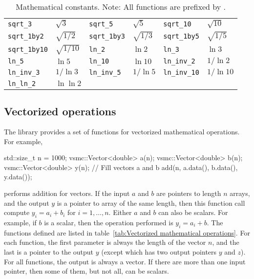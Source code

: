 \begin{table}[ht]
\begin{tabu}{X[2l]X[l]X[2l]X[l]X[2l]X[l]}
    \texttt{sqrt\_3}        & $\sqrt{3}$         &
    \texttt{sqrt\_5}        & $\sqrt{5}$         &
    \texttt{sqrt\_10}       & $\sqrt{10}$        \\
    \texttt{sqrt\_1by2}     & $\sqrt{1/2}$       &
    \texttt{sqrt\_1by3}     & $\sqrt{1/3}$       &
    \texttt{sqrt\_1by5}     & $\sqrt{1/5}$       \\
    \texttt{sqrt\_1by10}    & $\sqrt{1/10}$      &
    \texttt{ln\_2}          & $\ln{2}$           &
    \texttt{ln\_3}          & $\ln{3}$           \\
    \texttt{ln\_5}          & $\ln{5}$           &
    \texttt{ln\_10}         & $\ln{10}$          &
    \texttt{ln\_inv\_2}     & $1/\ln{2}$         \\
    \texttt{ln\_inv\_3}     & $1/\ln{3}$         &
    \texttt{ln\_inv\_5}     & $1/\ln{5}$         &
    \texttt{ln\_inv\_10}    & $1/\ln{10}$        \\
    \texttt{ln\_ln\_2}      & $\ln\ln{2}$        &
    &                    &
    &                    \\
    \bottomrule
  \end{tabu}
  \caption{Mathematical constants. Note: All functions are prefixed by
    .}
  \label{tab:Mathematical constants}
\end{table}

\subsection{Vectorized operations}
\label{sub:Vectorized operations}

The library provides a set of functions for vectorized mathematical operations.
For example,
\begin{cppcode}
  std::size_t n = 1000;
  vsmc::Vector<double> a(n);
  vsmc::Vector<double> b(n);
  vsmc::Vector<double> y(n);
  // Fill vectors a and b
  add(n, a.data(), b.data(), y.data());
\end{cppcode}
performs addition for vectors. If the input $a$ and $b$ are pointers to length
$n$ arrays, and the output $y$ is a pointer to array of the same length, then
this function call compute $y_i = a_i + b_i$ for $i=1,\dots,n$. Either $a$ and
$b$ can also be scalars. For example, if $b$ is a scalar, then the operation
performed is $y_i = a_i + b$. The functions defined are listed in
table~\ref{tab:Vectorized mathematical operations}. For each function, the
first parameter is always the length of the vector $n$, and the last is a
pointer to the output $y$ (except  which has two output
pointers $y$ and $z$). For all functions, the output is always a vector. If
there are more than one input pointer, then some of them, but not all, can be
scalars.

